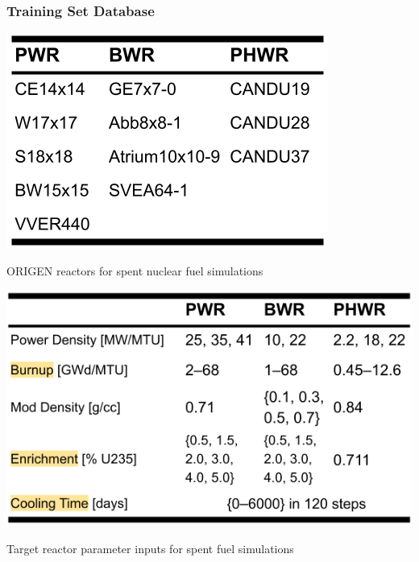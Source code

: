 
\begin{frame}
  \frametitle{Training Set Database}
  \begin{minipage}{0.43\textwidth}
    \begin{table}
      \centering
      \includegraphics[width=\textwidth]{./figures/trainset4_Orxtrs.png}
      \caption{ORIGEN reactors for spent nuclear fuel simulations}
    \end{table}
  \end{minipage}%
  \hfill
  \begin{minipage}{0.53\textwidth}
    \begin{table}
      \centering
      \includegraphics[width=\textwidth]{./figures/trainset4_inputs.png}
      \caption{Target reactor parameter inputs for spent fuel simulations}
    \end{table}
  \end{minipage}
\end{frame}

